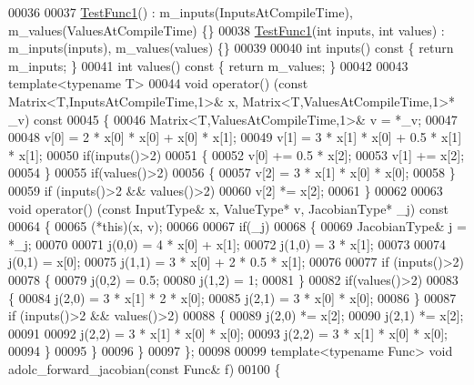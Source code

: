 \begin{DoxyCode}
00036 
00037   \hyperlink{struct_test_func1}{TestFunc1}() : m\_inputs(InputsAtCompileTime), m\_values(ValuesAtCompileTime) \{\}
00038   \hyperlink{struct_test_func1}{TestFunc1}(\textcolor{keywordtype}{int} inputs, \textcolor{keywordtype}{int} values) : m\_inputs(inputs), m\_values(values) \{\}
00039 
00040   \textcolor{keywordtype}{int} inputs()\textcolor{keyword}{ const }\{ \textcolor{keywordflow}{return} m\_inputs; \}
00041   \textcolor{keywordtype}{int} values()\textcolor{keyword}{ const }\{ \textcolor{keywordflow}{return} m\_values; \}
00042 
00043   \textcolor{keyword}{template}<\textcolor{keyword}{typename} T>
00044   \textcolor{keywordtype}{void} operator() (\textcolor{keyword}{const} Matrix<T,InputsAtCompileTime,1>& x, Matrix<T,ValuesAtCompileTime,1>* \_v)\textcolor{keyword}{ const}
00045 \textcolor{keyword}{  }\{
00046     Matrix<T,ValuesAtCompileTime,1>& v = *\_v;
00047 
00048     v[0] = 2 * x[0] * x[0] + x[0] * x[1];
00049     v[1] = 3 * x[1] * x[0] + 0.5 * x[1] * x[1];
00050     \textcolor{keywordflow}{if}(inputs()>2)
00051     \{
00052       v[0] += 0.5 * x[2];
00053       v[1] += x[2];
00054     \}
00055     \textcolor{keywordflow}{if}(values()>2)
00056     \{
00057       v[2] = 3 * x[1] * x[0] * x[0];
00058     \}
00059     \textcolor{keywordflow}{if} (inputs()>2 && values()>2)
00060       v[2] *= x[2];
00061   \}
00062 
00063   \textcolor{keywordtype}{void} operator() (\textcolor{keyword}{const} InputType& x, ValueType* v, JacobianType* \_j)\textcolor{keyword}{ const}
00064 \textcolor{keyword}{  }\{
00065     (*this)(x, v);
00066 
00067     \textcolor{keywordflow}{if}(\_j)
00068     \{
00069       JacobianType& j = *\_j;
00070 
00071       j(0,0) = 4 * x[0] + x[1];
00072       j(1,0) = 3 * x[1];
00073 
00074       j(0,1) = x[0];
00075       j(1,1) = 3 * x[0] + 2 * 0.5 * x[1];
00076 
00077       \textcolor{keywordflow}{if} (inputs()>2)
00078       \{
00079         j(0,2) = 0.5;
00080         j(1,2) = 1;
00081       \}
00082       \textcolor{keywordflow}{if}(values()>2)
00083       \{
00084         j(2,0) = 3 * x[1] * 2 * x[0];
00085         j(2,1) = 3 * x[0] * x[0];
00086       \}
00087       \textcolor{keywordflow}{if} (inputs()>2 && values()>2)
00088       \{
00089         j(2,0) *= x[2];
00090         j(2,1) *= x[2];
00091 
00092         j(2,2) = 3 * x[1] * x[0] * x[0];
00093         j(2,2) = 3 * x[1] * x[0] * x[0];
00094       \}
00095     \}
00096   \}
00097 \};
00098 
00099 \textcolor{keyword}{template}<\textcolor{keyword}{typename} Func> \textcolor{keywordtype}{void} adolc\_forward\_jacobian(\textcolor{keyword}{const} Func& f)
00100 \{

\end{DoxyCode}

